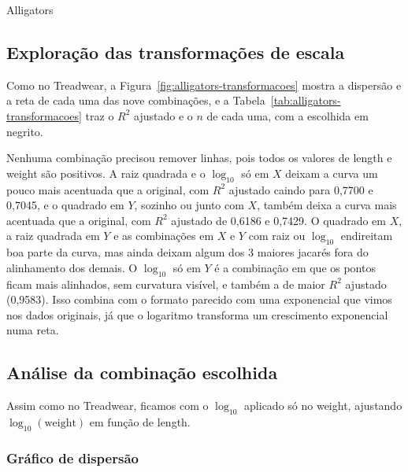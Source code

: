 \begin{dataset}{Alligators}
\subsection{Exploração das transformações de escala}

Como no Treadwear, a Figura~\ref{fig:alligators-transformacoes} mostra a dispersão e a reta de cada uma das nove combinações, e a Tabela~\ref{tab:alligators-transformacoes} traz o $R^2$ ajustado e o $n$ de cada uma, com a escolhida em negrito.



Nenhuma combinação precisou remover linhas, pois todos os valores de length e weight são positivos. A raiz quadrada e o $\log_{10}$ só em $X$ deixam a curva um pouco mais acentuada que a original, com $R^2$ ajustado caindo para 0,7700 e 0,7045, e o quadrado em $Y$, sozinho ou junto com $X$, também deixa a curva mais acentuada que a original, com $R^2$ ajustado de 0,6186 e 0,7429. O quadrado em $X$, a raiz quadrada em $Y$ e as combinações em $X$ e $Y$ com raiz ou $\log_{10}$ endireitam boa parte da curva, mas ainda deixam algum dos 3 maiores jacarés fora do alinhamento dos demais. O $\log_{10}$ só em $Y$ é a combinação em que os pontos ficam mais alinhados, sem curvatura visível, e também a de maior $R^2$ ajustado (0,9583). Isso combina com o formato parecido com uma exponencial que vimos nos dados originais, já que o logaritmo transforma um crescimento exponencial numa reta.

\subsection{Análise da combinação escolhida}

Assim como no Treadwear, ficamos com o $\log_{10}$ aplicado só no weight, ajustando $\log_{10}(\text{weight})$ em função de length.

\subsubsection{Gráfico de dispersão}



\end{dataset}
